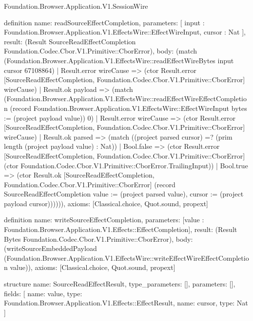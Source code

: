 \begin{lexlean}{Foundation.Browser.Application.V1.SessionWire}
\begin{semanticmodule}
definition{
  name: readSourceEffectCompletion,
  parameters: [
    input : Foundation.Browser.Application.V1.EffectsWire::EffectWireInput,
    cursor : Nat
  ],
  result: (Result SourceReadEffectCompletion Foundation.Codec.Cbor.V1.Primitive::CborError),
  body: (match (Foundation.Browser.Application.V1.EffectsWire::readEffectWireBytes input cursor 67108864)
    | Result.error wireCause => (ctor Result.error [SourceReadEffectCompletion, Foundation.Codec.Cbor.V1.Primitive::CborError] wireCause)
    | Result.ok payload => (match (Foundation.Browser.Application.V1.EffectsWire::readEffectWireEffectCompletion (record Foundation.Browser.Application.V1.EffectsWire::EffectWireInput {bytes := (project payload value)}) 0)
      | Result.error wireCause => (ctor Result.error [SourceReadEffectCompletion, Foundation.Codec.Cbor.V1.Primitive::CborError] wireCause)
      | Result.ok parsed => (match ((project parsed cursor) =? (prim length (project payload value) : Nat))
        | Bool.false => (ctor Result.error [SourceReadEffectCompletion, Foundation.Codec.Cbor.V1.Primitive::CborError] (ctor Foundation.Codec.Cbor.V1.Primitive::CborError.TrailingInput))
        | Bool.true => (ctor Result.ok [SourceReadEffectCompletion, Foundation.Codec.Cbor.V1.Primitive::CborError] (record SourceReadEffectCompletion {value := (project parsed value), cursor := (project payload cursor)}))))),
  axioms: [Classical.choice, Quot.sound, propext]
}

definition{
  name: writeSourceEffectCompletion,
  parameters: [value : Foundation.Browser.Application.V1.Effects::EffectCompletion],
  result: (Result Bytes Foundation.Codec.Cbor.V1.Primitive::CborError),
  body: (writeSourceEmbeddedPayload (Foundation.Browser.Application.V1.EffectsWire::writeEffectWireEffectCompletion value)),
  axioms: [Classical.choice, Quot.sound, propext]
}

structure{
  name: SourceReadEffectResult,
  type_parameters: [],
  parameters: [],
  fields: [
    {name: value, type: Foundation.Browser.Application.V1.Effects::EffectResult},
    {name: cursor, type: Nat}
  ]
}


\end{semanticmodule}
\end{lexlean}
